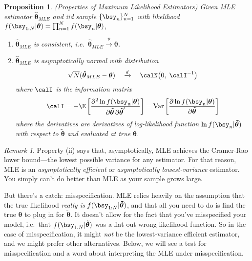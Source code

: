 \documentclass[12pt]{article}
\theoremstyle{plain}
\newtheorem{prop}[thm]{Proposition}
\theoremstyle{definition}
\theoremstyle{remark}
\newtheorem*{rmk}{Remark}
\newcommand{\bstheta}{\boldsymbol{\theta}}
\newcommand{\bshattheta}{\boldsymbol{\hat{\theta}}}
\newcommand{\bstildetheta}{\boldsymbol{\tilde{\theta}}}
\newcommand{\Var}{\operatorname{Var}}
\newcommand{\pto}{\xrightarrow{p}}
\newcommand{\dto}{\xrightarrow{d}}
\newcommand{\prodnN}{\prod^N_{n=1}}
\newcommand{\nN}{_{n=1}^N}
\begin{document}
\begin{prop}\emph{(Properties of Maximum Likelihood Estimators)}
Given MLE estimator $\bshattheta_{MLE}$ and iid sample $\{\bsy_n\}\nN$
with likelihood $f(\bsy_{1:N}|\bstheta) =\prodnN f(\bsy_n|\bstheta)$,
\begin{enumerate}[label=\emph{(\roman*)}]
  \item $\bshattheta_{MLE}$ is consistent, i.e.\
    $\bshattheta_{MLE}\pto\bstheta$.
  \item $\bshattheta_{MLE}$ is asymptotically normal with distribution
    \begin{align*}
      \sqrt{N}(\bshattheta_{MLE}-\bstheta)
      \quad\dto\quad
      \calN\big(0,\;
      \calI^{-1}
      \big)
    \end{align*}
    where $\calI$ is the information matrix
    \begin{align*}
      \calI
      = -\E\left[
        \frac{\partial^2 \ln f(\bsy_n|\bstheta)}{%
          \partial \bstildetheta \,\partial \bstildetheta'}
        \right]
      = \Var\left[
        \frac{\partial \ln f(\bsy_n|\bstheta)}{%
          \partial \bstildetheta}
        \right]
    \end{align*}
    where the derivatives are derivatives of log-likelihood function
    $\ln f(\bsy_n|\bstildetheta)$ with respect to $\bstildetheta$ and
    evaluated at true $\bstheta$.
\end{enumerate}
\end{prop}
\begin{rmk}
Property (ii) says that, asymptotically, MLE achieves the Cramer-Rao
lower bound---the lowest possible variance for any estimator. For that
reason, MLE is an \emph{asymptotically efficient} or
\emph{asymptotically lowest-variance} estimator. You simply can't do
better than MLE as your sample grows large.

But there's a catch: misspecification.
MLE relies heavily on the assumption that the true likelihood
\emph{really is} $f(\bsy_{1:N}|\bstildetheta)$, and that all you need to
do is find the true $\bstheta$ to plug in for $\bstildetheta$. It
doesn't allow for the fact that you've misspecified your model, i.e.\
that $f(\bsy_{1:N}|\bstildetheta)$ was a flat-out wrong likelihood
function. So in the case of misspecification, it might \emph{not} be the
lowest-variance efficient estimator, and we might prefer other
alternatives. Below, we will see a test for misspecification and a word
about interpreting the MLE under misspecification.
\end{rmk}
\end{document}

